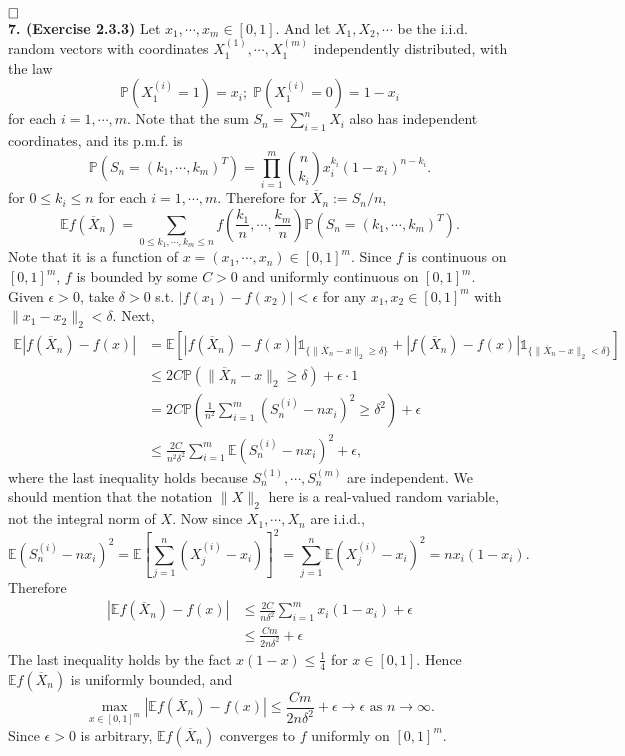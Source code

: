 \documentclass[12pt]{extarticle}
\begin{document}
$\hspace{\fill}\square$
\\
\textbf{7. (Exercise 2.3.3)} Let $x_1,\cdots,x_m\in[0,1]$. And let $X_1,X_2,\cdots$ be the i.i.d. random vectors with coordinates $X_1^{(1)},\cdots,X_1^{(m)}$ independently distributed, with the law 
\[
\mathbb{P}(X_1^{(i)}=1)=x_i;\;\mathbb{P}(X_1^{(i)}=0)=1-x_i
\]
for each $i=1,\cdots,m$.
Note that the sum $S_n=\sum_{i=1}^nX_i$ also has independent coordinates, and its p.m.f. is
\[
\mathbb{P}\left(S_n=(k_1,\cdots,k_m)^T\right)=\prod_{i=1}^m\binom{n}{k_i}x_i^{k_i}(1-x_i)^{n-k_i}.
\]
for $0\leq k_i\leq n$ for each $i=1,\cdots,m$.
Therefore for $\overline{X}_n:=S_n/n$,
\[
\mathbb{E}f(\overline{X}_n)=\sum_{0\leq k_1,\cdots,k_m\leq n}f\left(\frac{k_1}{n},\cdots,\frac{k_m}{n}\right)\mathbb{P}\left(S_n=(k_1,\cdots,k_m)^T\right).
\]
Note that it is a function of $x=(x_1,\cdots,x_n)\in[0,1]^m$. Since $f$ is continuous on $[0,1]^m$, $f$ is bounded by some $C>0$ and uniformly continuous on $[0,1]^m$. Given $\epsilon	>0$, take $\delta>0$ s.t. $|f(x_1)-f(x_2)|<\epsilon$ for any $x_1,x_2\in[0,1]^m$ with $\|x_1-x_2\|_2<\delta$. Next,
\[
\begin{aligned}
\mathbb{E}\left|f(\overline{X}_n)-f(x)\right|
&=
\mathbb{E}\left[
\left|f(\overline{X}_n)-f(x)\right|\mathds{1}_{\{\|\overline{X}_n-x\|_2\geq\delta\}}
+
\left|f(\overline{X}_n)-f(x)\right|\mathds{1}_{\{\|\overline{X}_n-x\|_2<\delta\}}
\right]
\\&
\leq 2C\mathbb{P}(\|\overline{X}_n-x\|_2\geq\delta)+\epsilon\cdot 1
\\&=
2C\mathbb{P}\left(\frac{1}{n^2}\sum_{i=1}^m(S_n^{(i)}-nx_i)^2\geq \delta^2\right)+\epsilon
\\&\leq
\frac{2C}{n^2\delta^2}\sum_{i=1}^m\mathbb{E}(S_n^{(i)}-nx_i)^2+\epsilon,
\end{aligned}
\]
where the last inequality holds because $S_n^{(1)},\cdots,S_n^{(m)}$ are independent.
We should mention that the notation $\|X\|_2$ here is a real-valued random variable, not the integral norm of $X$.
Now since $X_1,\cdots,X_n$ are i.i.d.,
\[
\mathbb{E}(S_n^{(i)}-nx_i)^2=\mathbb{E}\left[\sum_{j=1}^n(X_j^{(i)}-x_i)\right]^2
=
\sum_{j=1}^n\mathbb{E}(X_j^{(i)}-x_i)^2=nx_i(1-x_i).
\]
Therefore
\[
\begin{aligned}
\left|\mathbb{E}f(\overline{X}_n)-f(x)\right|
&\leq
\frac{2C}{n\delta^2}\sum_{i=1}^mx_i(1-x_i)+\epsilon
\\&\leq
\frac{Cm}{2n\delta^2}+\epsilon
\end{aligned}
\]
The last inequality holds by the fact $x(1-x)\leq\frac{1}{4}$ for $x\in[0,1]$. Hence $\mathbb{E}f(\overline{X}_n)$ is uniformly bounded, and
\[
\max_{x\in[0,1]^m}\left|\mathbb{E}f(\overline{X}_n)-f(x)\right|\leq\frac{Cm}{2n\delta^2}+\epsilon
\rightarrow\epsilon\text{ as }n\rightarrow\infty.
\]
Since $\epsilon>0$ is arbitrary, $\mathbb{E}f(\overline{X}_n)$ converges to $f$ uniformly on $[0,1]^m$.
\end{document}

